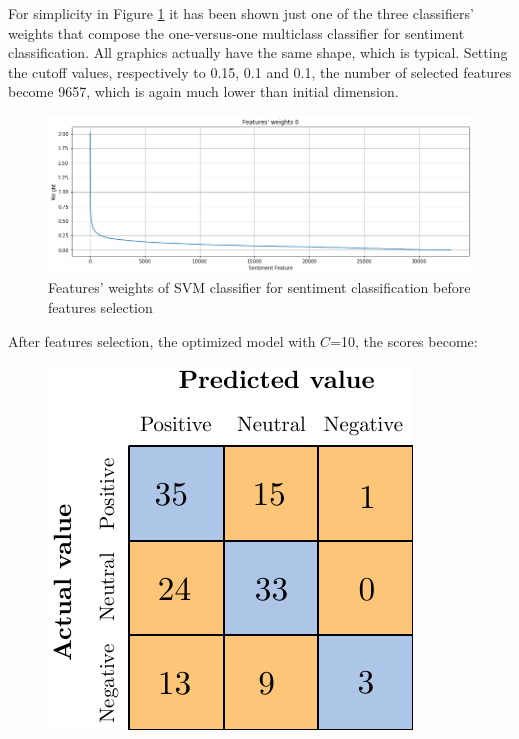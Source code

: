 For simplicity in Figure \ref{fig:ita_snt_svm_fs} it has been shown just one of the three classifiers' weights that compose the one-versus-one multiclass classifier for sentiment classification. All graphics actually have the same shape, which is typical. Setting the cutoff values, respectively to 0.15, 0.1 and 0.1, the number of selected features become 9657, which is again much lower than initial dimension.

\begin{figure}[H]
	\centering
	\includegraphics[width=\textwidth]{figures/conf_matrices/ita_snt_svm/ita_snt_svm_fs.png}
	\caption{Features' weights of SVM classifier for sentiment classification before features selection}
	\label{fig:ita_snt_svm_fs}
\end{figure}

After features selection, the optimized model with $C$=10, the scores become:
\begin{figure}[H]
	\centering
	\includegraphics[scale=1]{figures/conf_matrices/ita_snt_svm/ita_snt_svm_afs.pdf}
	\label{fig:ita_snt_svm_afs}
\end{figure}

